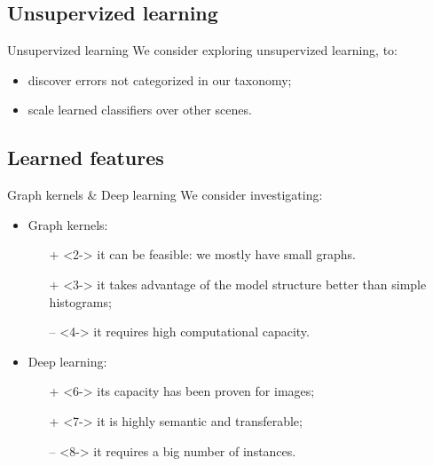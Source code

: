 \documentclass{beamer}
\begin{document}
        \subsection{Unsupervized learning}
            \begin{frame}{Unsupervized learning}
                We consider exploring unsupervized learning, to:
                \begin{itemize}[label=$\blacktriangleright$, font=\color{IGNGreen}]
                    \item<2-> discover errors not categorized in our taxonomy;
                    \item<3-> scale learned classifiers over other scenes.
                \end{itemize}
            \end{frame}
        \subsection{Learned features}
            \begin{frame}{Graph kernels \& Deep learning}
                We consider investigating:
                \begin{itemize}[label=$\blacktriangleright$, font=\color{IGNGreen}]
                    \item<1-> Graph kernels:
                    \begin{itemize}
                        \item[\color{green} +]<2-> it can be feasible: we mostly have small graphs.
                        \item[\color{green} +]<3-> it takes advantage of the model structure better than simple histograms;
                        \item[\color{red} --]<4-> it requires high computational capacity.
                    \end{itemize}
                    \item<5-> Deep learning:
                    \begin{itemize}
                        \item[\color{green} +]<6-> its capacity has been proven for images;
                        \item[\color{green} +]<7-> it is highly semantic and transferable;
                        \item[\color{red} --]<8-> it requires a big number of instances.
                    \end{itemize}
                \end{itemize}
            \end{frame}
\end{document}
